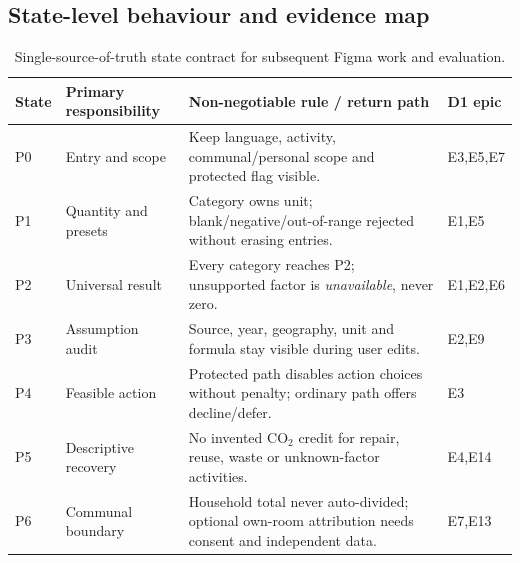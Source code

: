 \documentclass[12pt,a4paper]{article}
\begin{document}
\subsection{State-level behaviour and evidence map}
\begin{table}[ht]
\centering\small
\caption{Single-source-of-truth state contract for subsequent Figma work and evaluation.}
\label{tab:state-contract}
\begin{tabularx}{\textwidth}{@{}p{0.85cm}p{2.15cm}Xp{1.9cm}@{}}
\toprule
\textbf{State}&\textbf{Primary responsibility}&\textbf{Non-negotiable rule / return path}&\textbf{D1 epic}\\
\midrule
P0&Entry and scope&Keep language, activity, communal/personal scope and protected flag visible.&E3,E5,E7\\
P1&Quantity and presets&Category owns unit; blank/negative/out-of-range rejected without erasing entries.&E1,E5\\
P2&Universal result&Every category reaches P2; unsupported factor is \emph{unavailable}, never zero.&E1,E2,E6\\
P3&Assumption audit&Source, year, geography, unit and formula stay visible during user edits.&E2,E9\\
P4&Feasible action&Protected path disables action choices without penalty; ordinary path offers decline/defer.&E3\\
P5&Descriptive recovery&No invented CO$_2$ credit for repair, reuse, waste or unknown-factor activities.&E4,E14\\
P6&Communal boundary&Household total never auto-divided; optional own-room attribution needs consent and independent data.&E7,E13\\
\bottomrule
\end{tabularx}
\end{table}
\end{document}
